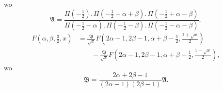\noindent wo
\[\mathfrak{A}=\frac{\Pi(-\tfrac12){.}\,\Pi(-\tfrac12-\alpha+\beta){.}\,\Pi(-\tfrac12+\alpha-\beta)}{\Pi(-\tfrac12-\alpha){.}\,\Pi(-\tfrac12-\beta){.}\,\Pi(-\tfrac12-\alpha-\beta)};\]
\begin{equation}
\begin{aligned}
F\left(\alpha,\beta,\tfrac32,x\right)&=\frac{\mathfrak{B}}{\surd x}F\left(2\alpha-1,2\beta-1,\alpha+\beta-\tfrac12,\frac{1+\surd x}{2}\right)\\[.7em]
&\qquad-\frac{\mathfrak{B}}{\surd x}F\left(2\alpha-1,2\beta-1,\alpha+\beta-\tfrac12,\frac{1-\surd x}{2}\right),
\end{aligned}\tag*{VI.}
\end{equation}
\clearpage{}
\noindent wo
\[\mathfrak{B}=\frac{2\alpha+2\beta-1}{(2\alpha-1)(2\beta-1)}\mathfrak{A}.\]
\clearpage
\endgroup
